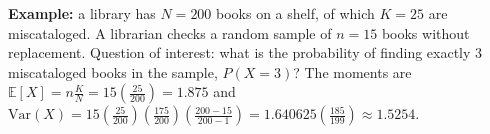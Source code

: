 \begin{solproblema}[prob:969b25a]
	\textbf{Example:} a library has $N=200$ books on a shelf, of which $K=25$ are miscataloged. A librarian checks a random sample of $n=15$ books without replacement. Question of interest: what is the probability of finding exactly $3$ miscataloged books in the sample, $P(X=3)$? The moments are $\mathbb{E}[X] = n\frac{K}{N} = 15\left(\frac{25}{200}\right) = 1.875$ and $\text{Var}(X) = 15\left(\frac{25}{200}\right)\left(\frac{175}{200}\right)\left(\frac{200-15}{200-1}\right) = 1.640625\left(\frac{185}{199}\right) \approx 1.5254$.
\end{solproblema}

